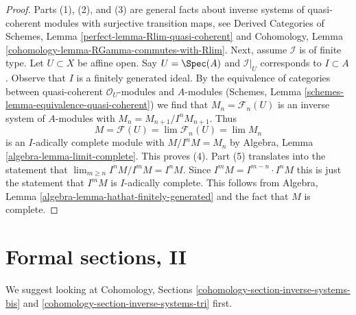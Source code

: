 \begin{proof}
Parts (1), (2), and (3) are general facts about inverse systems of
quasi-coherent modules with surjective transition maps, see
Derived Categories of Schemes, Lemma \ref{perfect-lemma-Rlim-quasi-coherent}
and Cohomology, Lemma \ref{cohomology-lemma-RGamma-commutes-with-Rlim}.
Next, assume $\mathcal{I}$ is of finite type.
Let $U \subset X$ be affine open. Say $U = \Spec(A)$ and $\mathcal{I}|_U$
corresponds to $I \subset A$. Observe that $I$ is a finitely generated ideal.
By the equivalence of categories between quasi-coherent $\mathcal{O}_U$-modules
and $A$-modules (Schemes, Lemma \ref{schemes-lemma-equivalence-quasi-coherent})
we find that $M_n = \mathcal{F}_n(U)$ is an inverse system
of $A$-modules with $M_n = M_{n + 1}/I^nM_{n + 1}$. Thus
$$
M = \mathcal{F}(U) = \lim \mathcal{F}_n(U) = \lim M_n
$$
is an $I$-adically complete module with $M/I^nM = M_n$ by
Algebra, Lemma \ref{algebra-lemma-limit-complete}. This proves (4).
Part (5) translates into the statement that
$\lim_{m \geq n} I^nM/I^mM = I^nM$.
Since $I^mM = I^{m - n} \cdot I^nM$ this is just the statement that
$I^mM$ is $I$-adically complete. This follows from
Algebra, Lemma \ref{algebra-lemma-hathat-finitely-generated}
and the fact that $M$ is complete.
\end{proof}

\section{Formal sections, II}
\label{algebraization-section-formal-functions-principal}
We suggest looking at
Cohomology, Sections
\ref{cohomology-section-inverse-systems-bis} and
\ref{cohomology-section-inverse-systems-tri} first.

